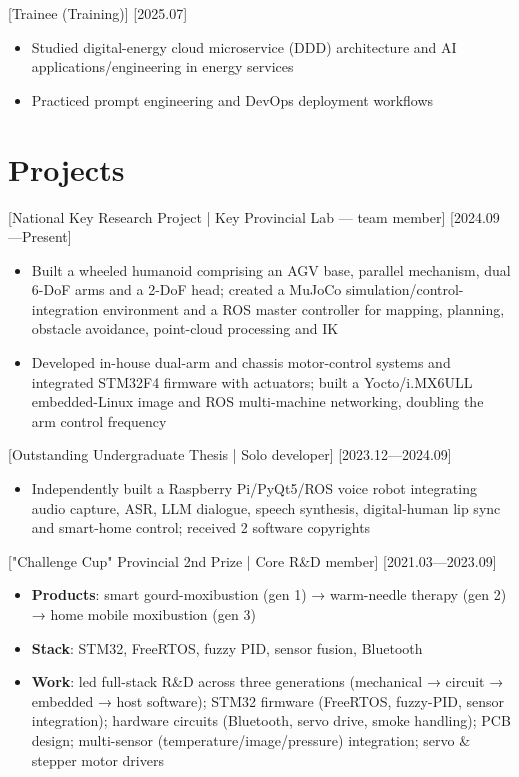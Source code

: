 \documentclass{resume-photo}
\begin{document}
[\textnormal{Trainee (Training)}]
[2025.07]

\begin{itemize}
  \item Studied digital-energy cloud microservice (DDD) architecture and AI applications/engineering in energy services
  \item Practiced prompt engineering and DevOps deployment workflows
\end{itemize}

\section{Projects}

[\textnormal{National Key Research Project | Key Provincial Lab — team member}]
[2024.09—Present]

\begin{itemize}
  \item Built a wheeled humanoid comprising an AGV base, parallel mechanism, dual 6-DoF arms and a 2-DoF head; created a MuJoCo simulation/control-integration environment and a ROS master controller for mapping, planning, obstacle avoidance, point-cloud processing and IK
  \item Developed in-house dual-arm and chassis motor-control systems and integrated STM32F4 firmware with actuators; built a Yocto/i.MX6ULL embedded-Linux image and ROS multi-machine networking, doubling the arm control frequency
\end{itemize}

[\textnormal{Outstanding Undergraduate Thesis | Solo developer}]
[2023.12—2024.09]

\begin{itemize}
  \item Independently built a Raspberry Pi/PyQt5/ROS voice robot integrating audio capture, ASR, LLM dialogue, speech synthesis, digital-human lip sync and smart-home control; received 2 software copyrights
\end{itemize}

[\textnormal{"Challenge Cup" Provincial 2nd Prize | Core R\&D member}]
[2021.03—2023.09]

\begin{itemize}
  \item \textbf{Products}: smart gourd-moxibustion (gen 1) → warm-needle therapy (gen 2) → home mobile moxibustion (gen 3)
  \item \textbf{Stack}: STM32, FreeRTOS, fuzzy PID, sensor fusion, Bluetooth
  \item \textbf{Work}: led full-stack R\&D across three generations (mechanical → circuit → embedded → host software); STM32 firmware (FreeRTOS, fuzzy-PID, sensor integration); hardware circuits (Bluetooth, servo drive, smoke handling); PCB design; multi-sensor (temperature/image/pressure) integration; servo \& stepper motor drivers
\end{itemize}
\end{document}
